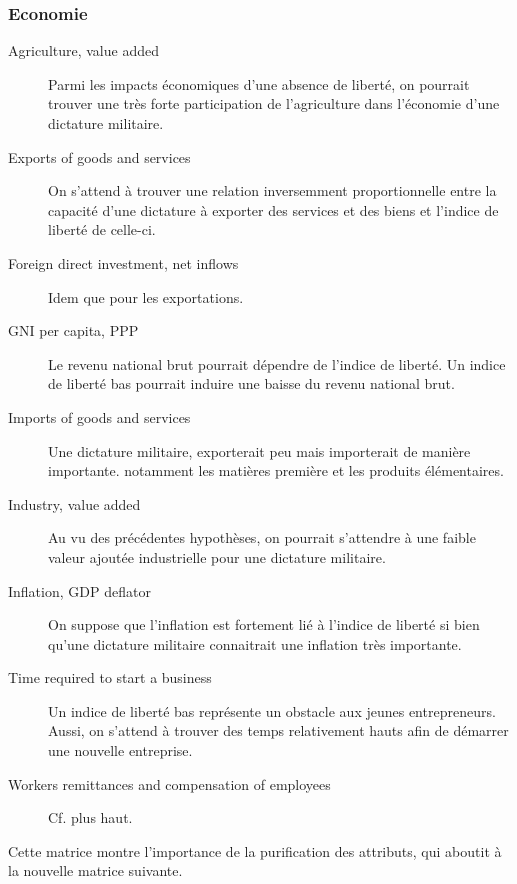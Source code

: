 \subsubsection{Economie}
\begin{description}
\item [Agriculture, value added]
Parmi les impacts économiques d'une absence de liberté, on pourrait trouver une très forte participation de l'agriculture dans l'économie d'une dictature militaire.
\item [Exports of goods and services]
On s'attend à trouver une relation inversemment proportionnelle entre la capacité d'une dictature à exporter des services et des biens et l'indice de liberté de celle-ci.
\item [Foreign direct investment, net inflows]
Idem que pour les exportations. 
\item [GNI per capita, PPP]
Le revenu national brut pourrait dépendre de l'indice de liberté. Un indice de liberté bas pourrait induire une baisse du revenu national brut.
\item [Imports of goods and services] 
Une dictature militaire, exporterait peu mais importerait de manière importante. notamment les matières première et les produits élémentaires.
\item [Industry, value added]
Au vu des précédentes hypothèses, on pourrait s'attendre à une faible valeur ajoutée industrielle pour une dictature militaire. 
\item [Inflation, GDP deflator] 
On suppose que l'inflation est fortement lié à l'indice de liberté si bien qu'une dictature militaire connaitrait une inflation très importante.
\item [Time required to start a business]
Un indice de liberté bas représente un obstacle aux jeunes entrepreneurs. Aussi, on s'attend à trouver des temps relativement hauts afin de démarrer une nouvelle entreprise. 
\item [Workers remittances and compensation of employees]
Cf. plus haut.
\end{description}

Cette matrice montre l'importance de la purification des attributs, qui aboutit à la nouvelle matrice suivante.

